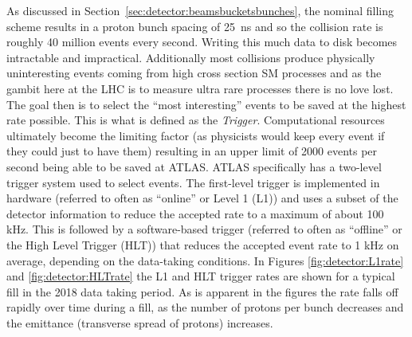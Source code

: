 As discussed in Section~\ref{sec:detector:beamsbucketsbunches}, the nominal filling scheme results in a proton bunch spacing of 25~ns and so the collision rate is roughly 40 million events every second.
Writing this much data to disk becomes intractable and impractical.
Additionally most collisions produce physically uninteresting events coming from high cross section SM processes and as the gambit here at the LHC is to measure ultra rare processes there is no love lost. 
The goal then is to select the ``most interesting'' events to be saved at the highest rate possible.
This is what is defined as the \emph{Trigger}.
Computational resources ultimately become the limiting factor (as physicists would keep every event if they could just to have them) resulting in an upper limit of 2000 events per second being able to be saved at ATLAS.
ATLAS specifically has a two-level trigger system \cite{ATLAS:2016wtr} used to select events.
The first-level trigger is implemented in hardware (referred to often as ``online'' or Level 1 (L1)) and uses a subset of the detector information to reduce the accepted rate to a maximum of about 100 kHz.
This is followed by a software-based trigger (referred to often as ``offline'' or the High Level Trigger (HLT)) that reduces the accepted event rate to 1 kHz on average, depending on the data-taking conditions.
In Figures \ref{fig:detector:L1rate} and \ref{fig:detector:HLTrate} the L1 and HLT trigger rates are shown for a typical fill in the 2018 data taking period. 
As is apparent in the figures the rate falls off rapidly over time during a fill, as the number of protons per bunch decreases and the emittance (transverse spread of protons) increases.
